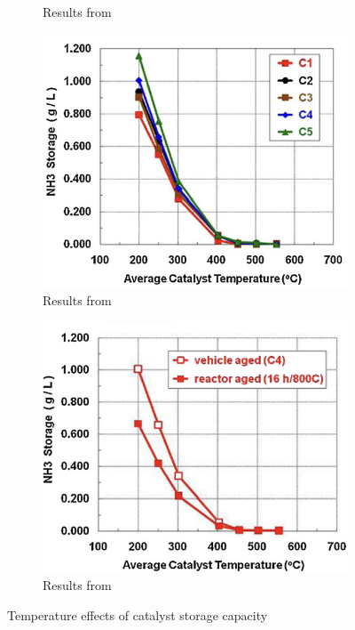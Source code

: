 \begin{figure}[H]
\begin{minipage}{0.49\textwidth}
\begin{figure}[H]
            \caption*{Results from \cite{schmieg2012thermal}}
        \end{figure}
    \end{minipage}
    \begin{minipage}{0.49\textwidth}
        \begin{figure}[H]
            \includegraphics[width = \textwidth]{./figs/storage_capacity/th_2.png}
            \caption*{Results from \cite{schmieg2012thermal}}
        \end{figure}
    \end{minipage}
    \begin{minipage}{0.49\textwidth}
        \begin{figure}[H]
            \includegraphics[width = \textwidth]{./figs/storage_capacity/th_3.png}
            \caption*{Results from \cite{schmieg2012thermal}}
        \end{figure}
    \end{minipage}
    \caption{Temperature effects of catalyst storage capacity}
\end{figure}



